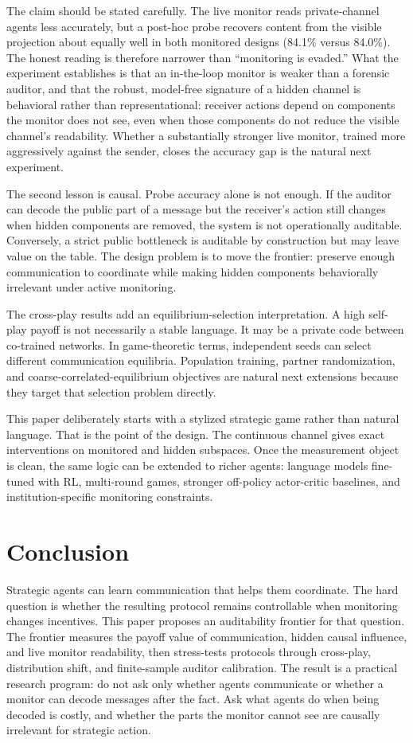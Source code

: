 \documentclass[11pt]{article}
\begin{document}
The claim should be stated carefully. The live monitor reads private-channel agents less accurately, but a post-hoc probe recovers content from the visible projection about equally well in both monitored designs (84.1\% versus 84.0\%). The honest reading is therefore narrower than ``monitoring is evaded.'' What the experiment establishes is that an in-the-loop monitor is weaker than a forensic auditor, and that the robust, model-free signature of a hidden channel is behavioral rather than representational: receiver actions depend on components the monitor does not see, even when those components do not reduce the visible channel's readability. Whether a substantially stronger live monitor, trained more aggressively against the sender, closes the accuracy gap is the natural next experiment.

The second lesson is causal. Probe accuracy alone is not enough. If the auditor can decode the public part of a message but the receiver's action still changes when hidden components are removed, the system is not operationally auditable. Conversely, a strict public bottleneck is auditable by construction but may leave value on the table. The design problem is to move the frontier: preserve enough communication to coordinate while making hidden components behaviorally irrelevant under active monitoring.

The cross-play results add an equilibrium-selection interpretation. A high self-play payoff is not necessarily a stable language. It may be a private code between co-trained networks. In game-theoretic terms, independent seeds can select different communication equilibria. Population training, partner randomization, and coarse-correlated-equilibrium objectives are natural next extensions because they target that selection problem directly.

This paper deliberately starts with a stylized strategic game rather than natural language. That is the point of the design. The continuous channel gives exact interventions on monitored and hidden subspaces. Once the measurement object is clean, the same logic can be extended to richer agents: language models fine-tuned with RL, multi-round games, stronger off-policy actor-critic baselines, and institution-specific monitoring constraints.

\section{Conclusion}

Strategic agents can learn communication that helps them coordinate. The hard question is whether the resulting protocol remains controllable when monitoring changes incentives. This paper proposes an auditability frontier for that question. The frontier measures the payoff value of communication, hidden causal influence, and live monitor readability, then stress-tests protocols through cross-play, distribution shift, and finite-sample auditor calibration. The result is a practical research program: do not ask only whether agents communicate or whether a monitor can decode messages after the fact. Ask what agents do when being decoded is costly, and whether the parts the monitor cannot see are causally irrelevant for strategic action.
\end{document}
